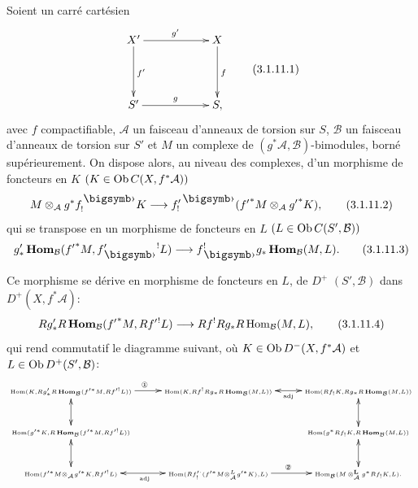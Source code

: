 \documentclass[10pt]{../fichiers-configuration-latex/smfart}
\begin{document}
\subsubsection{}
Soient un carré cartésien
\begin{equation*}
\vcenter{
\xymatrix@C=2cm@R=1.5cm{
X' \ar[r]^{g'}\ar[d]^{f'}& X\ar[d]^{f}\\
S' \ar[r]^{g} & S,
}}\tag{3.1.11.1}
\end{equation*}%
avec $f$ compactifiable, $\mathcal{A}$ un faisceau d'anneaux de
torsion sur $S$, $\mathcal{B}$ un faisceau d'anneaux de torsion sur
$S'$ et $M$ un complexe de
$(g^{\ast}\mathcal{A},\mathcal{B})$-bimodules, borné supérieurement. On dispose alors, au niveau des
complexes, d'un morphisme de foncteurs en $K$ $(K\in \operatorname{Ob}
C(X,f^{\ast}\mathcal{A}))$
\begin{equation*}
M\otimes_{\mathcal{A}}g^{\ast}f^{\bigdot}_{!}K\longrightarrow
f'_{!}{}^{\bigdot}
({f'}^{\ast}M\otimes_{\mathcal{A}}{g'}^{\ast}K){\quoi},\tag{3.1.11.2}
\end{equation*}%
qui se transpose en un morphisme de foncteurs en $L$ $(L\in \operatorname{Ob}
C(S',\mathcal{B}))$
\begin{equation*}
g'_{\ast}\Hhom_{\mathcal{B}}({f'}^{\ast}M,f'_{\bigdot}{}^{!}L)\longrightarrow
f^{!}_{\bigdot}g_\ast\Hhom_{\mathcal{B}}(M,L){\quoi}.\tag{3.1.11.3}
\end{equation*}

Ce morphisme se dérive en morphisme de foncteurs en $L$, de $D^{+}$
$(S',\mathcal{B})$ dans $D^{+}(X,f^{\ast}\mathcal{A})$:
\begin{equation*}
Rg'_{\ast}R\operatorname{\mathbf{Hom}}_{\mathcal{B}}({f'}^{\ast}M,Rf'{}^{!}L)\longrightarrow
Rf^{!}Rg_{\ast}R\operatorname{Hom}_{\mathcal{B}}(M,L){},\tag{3.1.11.4}
\end{equation*}%
qui rend commutatif le diagramme suivant, où $K\in \operatorname{Ob}
D^{-}(X,f^{\ast}\mathcal{A})$ et $L\in \operatorname{Ob} D^{+}(S',\mathcal{B})$:
$$
\xymatrix{
\scriptscriptstyle{\Hom(K,Rg'_{\ast} R\Hhom_{\Bb}(f'^{\ast}M,Rf'^{!}L))}
\ar@{<->}[d] \ar[r]^{\text{\ding{172}}} &
\scriptscriptstyle{\Hom(K,Rf^{!}Rg_{\ast}R\Hhom_{\Bb}(M,L))}
\ar@{<->}[r]_{{\scriptscriptstyle{\rm adj}}}& \scriptscriptstyle{\Hom(Rf_!K, Rg_{\ast}
R\Hhom_{\Bb}(M,L))}\ar@{<->}[d]\\
\scriptscriptstyle{\Hom(g'^{\ast}K,R\Hhom_{\Bb}(f'^{\ast} M, Rf'^{!}L))}\ar@{<->}[d] 
& &  \scriptscriptstyle{\Hom(g^{\ast}Rf_! K, R\Hhom_{\Bb} (M,L))} \ar@{<->}[d]\\
\scriptscriptstyle{\Hom(f'^{\ast}M\otimes_{\Aa}g'^{\ast}K,
Rf'^{!}L)} \ar@{<->}[r]_{\scriptscriptstyle{\rm adj}}& \scriptscriptstyle{\Hom(Rf'^{\cdot}_!(f'^{\ast}M\otimes^{L}_\Aa
g'^{\ast}K),L)}
\ar[r]^{\text{\ding{173}}} &
\scriptscriptstyle{\Hom_{\Bb}(M\mathop{\otimes}^{\LL}_\Aa g^{\ast}Rf_!K, L)}.
}
$$
\end{document}
